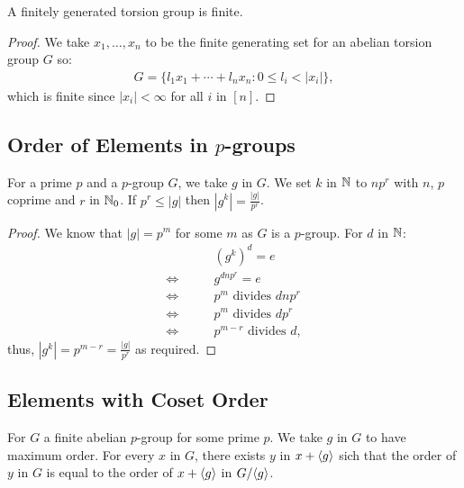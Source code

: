 A finitely generated torsion group is finite.

\begin{proof}
    We take $x_1, \ldots, x_n$ to be the finite generating set for
    an abelian torsion group $G$ so: \begin{align*}
        G = \{l_1x_1 + \cdots + l_nx_n : 0 \leq l_i < |x_i|\},
    \end{align*} which is finite since $|x_i| < \infty$ for all $i$ in $[n]$.
\end{proof}

\subsection{Order of Elements in $p$-groups}

For a prime $p$ and a $p$-group $G$, we take $g$ in $G$. We set $k$
in $\mathbb{N}$ to $np^r$ with $n$, $p$ coprime and $r$ in $\mathbb{N}_0$.
If $p^r \leq |g|$ then $|g^k| = \frac{|g|}{p^r}$.

\begin{proof}
    We know that $|g| = p^m$ for some $m$ as $G$ is a $p$-group.
    For $d$ in $\mathbb{N}$: \begin{align*}
        & (g^k)^d = e \\
        \Longleftrightarrow \qquad& g^{dnp^r} = e \\
        \Longleftrightarrow \qquad& p^m \text{ divides } dnp^r \\
        \Longleftrightarrow \qquad& p^m \text{ divides } dp^r \\
        \Longleftrightarrow \qquad& p^{m - r} \text{ divides } d,
    \end{align*} thus, $|g^k| = p^{m - r} = \frac{|g|}{p^r}$ as required.
\end{proof}

\subsection{Elements with Coset Order}

For $G$ a finite abelian $p$-group for some prime $p$. We take $g$ in $G$
to have maximum order. For every $x$ in $G$, there exists $y$ in $x + {\langle g \rangle}$
sich that the order of $y$ in $G$ is equal to the order of $x + {\langle g \rangle}$ in
$G / {\langle g \rangle}$.

